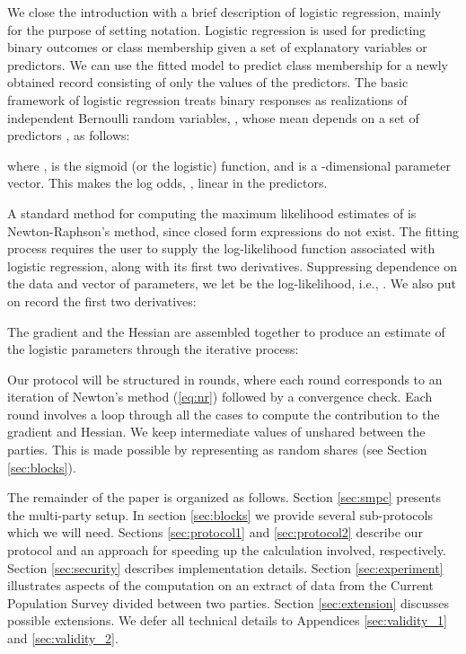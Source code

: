 \documentclass[11pt]{article}
\begin{document}
We close the introduction with a brief description of logistic regression, mainly for the purpose of setting notation.
Logistic regression is used for predicting binary outcomes or class membership given a set of explanatory variables or predictors. We can use the fitted model  to predict class membership for a newly obtained record consisting of only the values of  the predictors. The basic framework of logistic regression treats binary responses  as realizations of  independent Bernoulli random variables, , whose mean depends on a set of predictors , as follows:

where , is the sigmoid (or the logistic) function, and  is a -dimensional parameter vector. This makes the log odds, , linear in the predictors.

A standard method for computing the maximum likelihood estimates of  is Newton-Raphson's  method, since closed form expressions do not exist. The fitting process  requires the user to supply the log-likelihood function associated with logistic regression, along with its first two derivatives.  Suppressing dependence on the data and vector of parameters, we let  be the  log-likelihood, i.e., . We also put on record the first two derivatives:







The gradient and the Hessian are assembled together to produce an estimate of the logistic parameters through the iterative process:  

Our protocol will be structured in rounds, where each round corresponds to an iteration of Newton's method (\ref{eq:nr}) followed by a convergence check.  Each round involves a loop through all the cases  to compute the contribution to the gradient and Hessian.  
We keep intermediate values of  unshared between the parties. This is made possible by representing  as random shares (see Section \ref{sec:blocks}).



The remainder of the paper is organized as follows. Section \ref{sec:smpc} presents the multi-party setup.  In section \ref{sec:blocks} we provide several sub-protocols which we will need. Sections \ref{sec:protocol1} and \ref{sec:protocol2} describe our protocol and an approach for speeding up the calculation involved, respectively. Section \ref{sec:security} describes implementation details. Section \ref{sec:experiment}  illustrates aspects of the computation on an extract of data from the Current Population Survey divided between two parties. Section  \ref{sec:extension} discusses possible extensions.  We defer all technical details  to Appendices \ref{sec:validity_1} and \ref{sec:validity_2}. 
\end{document}
